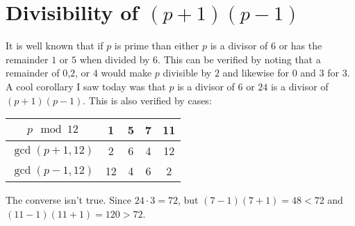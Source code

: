 
\section{Divisibility of $(p+1)(p-1)$}
It is well known that if $p$ is prime than either $p$ is a divisor of $6$ or has the remainder $1$ or $5$ when divided by $6$.
This can be verified by noting that a remainder of $0$,$2$, or $4$ would make $p$ divisible by $2$ and likewise for $0$ and $3$ for $3$.
\\

A cool corollary I saw today was that $p$ is a divisor of $6$ or $24$ is a divisor of $(p+1)(p-1)$.
This is also verified by cases:

\begin{center}
\begin{tabular}{|c|cccc|}
\hline
	$p\mod 12$&1&5&7&11\\
\hline
	$\gcd(p+1,12)$&2&6&4&12\\
	$\gcd(p-1,12)$&12&4&6&2\\
\hline
\end{tabular}
\end{center}

The converse isn't true.
Since $24\cdot 3 = 72$,
but $(7-1)(7+1) = 48 < 72$ and $(11-1)(11+1) = 120 > 72$.
